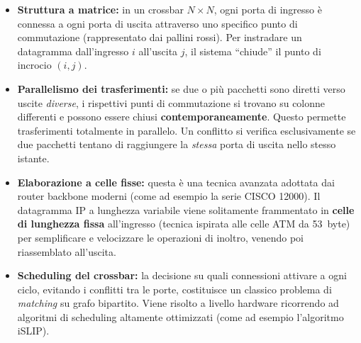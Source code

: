 \documentclass[a4paper,12pt]{report}
\begin{document}
\begin{itemize}
    \item \textbf{Struttura a matrice:} in un crossbar $N \times N$, ogni porta di ingresso è connessa a ogni porta di uscita attraverso uno specifico punto di commutazione (rappresentato dai pallini rossi). Per instradare un datagramma dall'ingresso $i$ all'uscita $j$, il sistema ``chiude'' il punto di incrocio $(i,j)$.
    \item \textbf{Parallelismo dei trasferimenti:} se due o più pacchetti sono diretti verso uscite \emph{diverse}, i rispettivi punti di commutazione si trovano su colonne differenti e possono essere chiusi \textbf{contemporaneamente}. Questo permette trasferimenti totalmente in parallelo. Un conflitto si verifica esclusivamente se due pacchetti tentano di raggiungere la \emph{stessa} porta di uscita nello stesso istante.
    \item \textbf{Elaborazione a celle fisse:} questa è una tecnica avanzata adottata dai router backbone moderni (come ad esempio la serie CISCO 12000). Il datagramma IP a lunghezza variabile viene solitamente frammentato in \textbf{celle di lunghezza fissa} all'ingresso (tecnica ispirata alle celle ATM da 53~byte) per semplificare e velocizzare le operazioni di inoltro, venendo poi riassemblato all'uscita.
    \item \textbf{Scheduling del crossbar:} la decisione su quali connessioni attivare a ogni ciclo, evitando i conflitti tra le porte, costituisce un classico problema di \emph{matching} su grafo bipartito. Viene risolto a livello hardware ricorrendo ad algoritmi di scheduling altamente ottimizzati (come ad esempio l'algoritmo iSLIP).
\end{itemize}
\newpage
\end{document}
